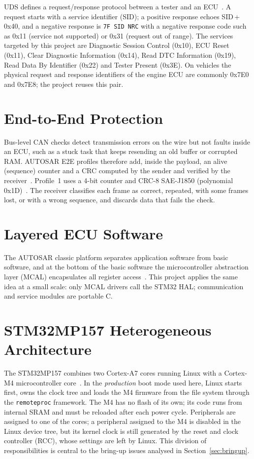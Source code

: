 UDS defines a request/response protocol between a tester and an ECU~\cite{ISO14229-1}. A request starts with a service identifier (SID); a positive response echoes SID\,+\,0x40, and a negative response is \texttt{7F SID NRC} with a negative response code such as 0x11 (service not supported) or 0x31 (request out of range). The services targeted by this project are Diagnostic Session Control (0x10), ECU Reset (0x11), Clear Diagnostic Information (0x14), Read DTC Information (0x19), Read Data By Identifier (0x22) and Tester Present (0x3E). On vehicles the physical request and response identifiers of the engine ECU are commonly 0x7E0 and 0x7E8; the project reuses this pair.

\section{End-to-End Protection}

Bus-level CAN checks detect transmission errors on the wire but not faults inside an ECU, such as a stuck task that keeps resending an old buffer or corrupted RAM. AUTOSAR E2E profiles therefore add, inside the payload, an alive (sequence) counter and a CRC computed by the sender and verified by the receiver~\cite{AUTOSAR_E2E}. Profile~1 uses a 4-bit counter and CRC-8 SAE-J1850 (polynomial 0x1D)~\cite{SAEJ1850}. The receiver classifies each frame as correct, repeated, with some frames lost, or with a wrong sequence, and discards data that fails the check.

\section{Layered ECU Software}

The AUTOSAR classic platform separates application software from basic software, and at the bottom of the basic software the microcontroller abstraction layer (MCAL) encapsulates all register access~\cite{AUTOSAR_LayeredArch}. This project applies the same idea at a small scale: only MCAL drivers call the STM32 HAL; communication and service modules are portable C.

\section{STM32MP157 Heterogeneous Architecture}

The STM32MP157 combines two Cortex-A7 cores running Linux with a Cortex-M4 microcontroller core~\cite{RM0436}. In the \textit{production} boot mode used here, Linux starts first, owns the clock tree and loads the M4 firmware from the file system through the \texttt{remoteproc} framework. The M4 has no flash of its own; its code runs from internal SRAM and must be reloaded after each power cycle. Peripherals are assigned to one of the cores; a peripheral assigned to the M4 is disabled in the Linux device tree, but its kernel clock is still generated by the reset and clock controller (RCC), whose settings are left by Linux. This division of responsibilities is central to the bring-up issues analysed in Section~\ref{sec:bringup}.
